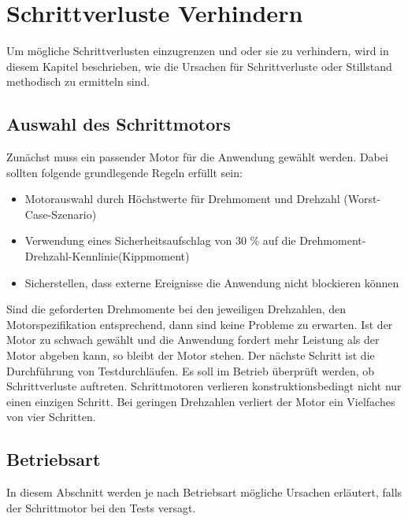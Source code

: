 %
%
\chapter{Schrittverluste Verhindern}
Um mögliche Schrittverlusten einzugrenzen und oder sie zu verhindern, wird in diesem Kapitel beschrieben, wie die Ursachen für Schrittverluste oder Stillstand methodisch zu ermitteln sind. \cite{FaulhaberDriveSystems.2020}

\section{Auswahl des Schrittmotors}
Zunächst muss ein passender Motor für die Anwendung gewählt werden. Dabei sollten folgende grundlegende Regeln erfüllt sein:
\begin{itemize}
	\item Motorauswahl durch Höchstwerte für Drehmoment und Drehzahl (Worst-Case-Szenario)
	\item Verwendung eines Sicherheitsaufschlag von 30 \% auf die Drehmoment-Drehzahl-Kennlinie(Kippmoment)
	\item Sicherstellen, dass externe Ereignisse die Anwendung nicht blockieren können
\end{itemize}

Sind die geforderten Drehmomente bei den jeweiligen Drehzahlen, den Motorspezifikation entsprechend, dann sind keine Probleme zu erwarten. Ist der Motor zu schwach gewählt und die Anwendung fordert mehr Leistung als der Motor abgeben kann, so bleibt der Motor stehen. Der nächste Schritt ist die Durchführung von Testdurchläufen. Es soll im Betrieb überprüft werden, ob Schrittverluste auftreten. Schrittmotoren verlieren konstruktionsbedingt nicht nur einen einzigen Schritt. Bei geringen Drehzahlen verliert der Motor ein Vielfaches von vier Schritten.\cite{FaulhaberDriveSystems.2020}

\section{Betriebsart}

In diesem Abschnitt werden je nach Betriebsart mögliche Ursachen erläutert, falls der Schrittmotor bei den Tests versagt.

